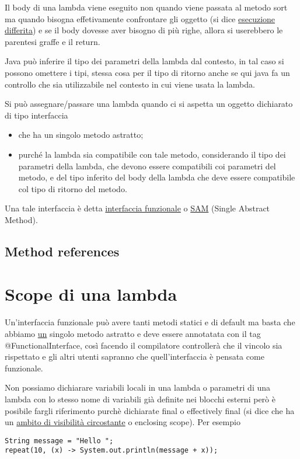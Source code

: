 Il body di una lambda viene eseguito non quando viene passata al metodo sort ma quando bisogna effetivamente confrontare gli oggetto 
(si dice \underline{esecuzione differita}) e se il body dovesse aver bisogno di più righe, allora si userebbero le parentesi graffe e il return.
\smallskip

Java può inferire il tipo dei parametri della lambda dal contesto, in tal caso si possono omettere i tipi, stessa cosa per il tipo di ritorno anche se qui java fa un 
controllo che sia utilizzabile nel contesto in cui viene usata la lambda.

Si può assegnare/passare una lambda quando ci si aspetta un oggetto dichiarato di tipo interfaccia
\begin{itemize}
    \item che ha un singolo metodo astratto;
    \item purché la lambda sia compatibile con tale metodo, considerando il tipo dei parametri della lambda, che devono essere compatibili coi parametri del metodo, 
    e del tipo inferito del body della lambda che deve essere compatibile col tipo di ritorno del metodo.
\end{itemize}

Una tale interfaccia è detta \underline{interfaccia funzionale} o \underline{SAM} (Single Abstract Method).

\subsection{Method references}


\section{Scope di una lambda}
Un'interfaccia funzionale può avere tanti metodi statici e di default ma basta che abbiamo \underline{un} singolo metodo astratto e deve essere annotatata con il tag 
@FunctionalInterface, così facendo il compilatore controllerà che il vincolo sia rispettato e gli altri utenti sapranno che quell'interfaccia è pensata come funzionale.
\smallskip

Non possiamo dichiarare variabili locali in una lambda o parametri di una lambda con lo stesso nome di variabili già definite nei blocchi esterni però è posibile
fargli riferimento purchè dichiarate final o effectively final (si dice che ha un \underline{ambito di visibilità circostante} o enclosing scope). 
Per esempio
\begin{lstlisting}
String message = "Hello ";
repeat(10, (x) -> System.out.println(message + x));
\end{lstlisting}

